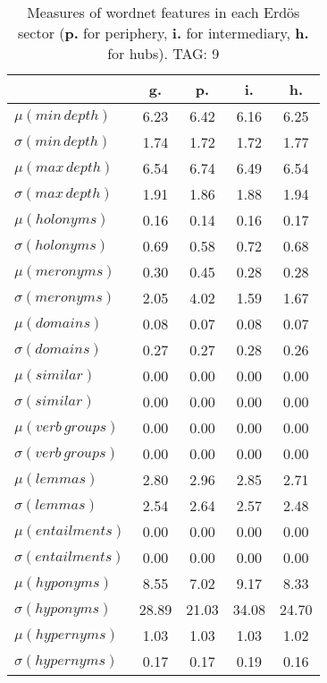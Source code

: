 \begin{table}[h!]
\begin{center}
\begin{tabular}{| l || c | c | c | c |}\hline
 & {\bf g.} & {\bf p.} & {\bf i.} & {\bf h.} \\\hline\hline
$\mu(min\,depth)$ & 6.23  & 6.42  & 6.16  & 6.25 \\
$\sigma(min\,depth)$ & 1.74  & 1.72  & 1.72  & 1.77 \\\hline
$\mu(max\,depth)$ & 6.54  & 6.74  & 6.49  & 6.54 \\
$\sigma(max\,depth)$ & 1.91  & 1.86  & 1.88  & 1.94 \\\hline
$\mu(holonyms)$ & 0.16  & 0.14  & 0.16  & 0.17 \\
$\sigma(holonyms)$ & 0.69  & 0.58  & 0.72  & 0.68 \\\hline
$\mu(meronyms)$ & 0.30  & 0.45  & 0.28  & 0.28 \\
$\sigma(meronyms)$ & 2.05  & 4.02  & 1.59  & 1.67 \\\hline
$\mu(domains)$ & 0.08  & 0.07  & 0.08  & 0.07 \\
$\sigma(domains)$ & 0.27  & 0.27  & 0.28  & 0.26 \\\hline
$\mu(similar)$ & 0.00  & 0.00  & 0.00  & 0.00 \\
$\sigma(similar)$ & 0.00  & 0.00  & 0.00  & 0.00 \\\hline
$\mu(verb\,groups)$ & 0.00  & 0.00  & 0.00  & 0.00 \\
$\sigma(verb\,groups)$ & 0.00  & 0.00  & 0.00  & 0.00 \\\hline
$\mu(lemmas)$ & 2.80  & 2.96  & 2.85  & 2.71 \\
$\sigma(lemmas)$ & 2.54  & 2.64  & 2.57  & 2.48 \\\hline
$\mu(entailments)$ & 0.00  & 0.00  & 0.00  & 0.00 \\
$\sigma(entailments)$ & 0.00  & 0.00  & 0.00  & 0.00 \\\hline
$\mu(hyponyms)$ & 8.55  & 7.02  & 9.17  & 8.33 \\
$\sigma(hyponyms)$ & 28.89  & 21.03  & 34.08  & 24.70 \\\hline
$\mu(hypernyms)$ & 1.03  & 1.03  & 1.03  & 1.02 \\
$\sigma(hypernyms)$ & 0.17  & 0.17  & 0.19  & 0.16 \\\hline
\end{tabular}
\caption{Measures of wordnet features in each Erd\"os sector ({{\bf p.}} for periphery, {{\bf i.}} for intermediary, {{\bf h.}} for hubs). TAG: 9}
\end{center}
\end{table}